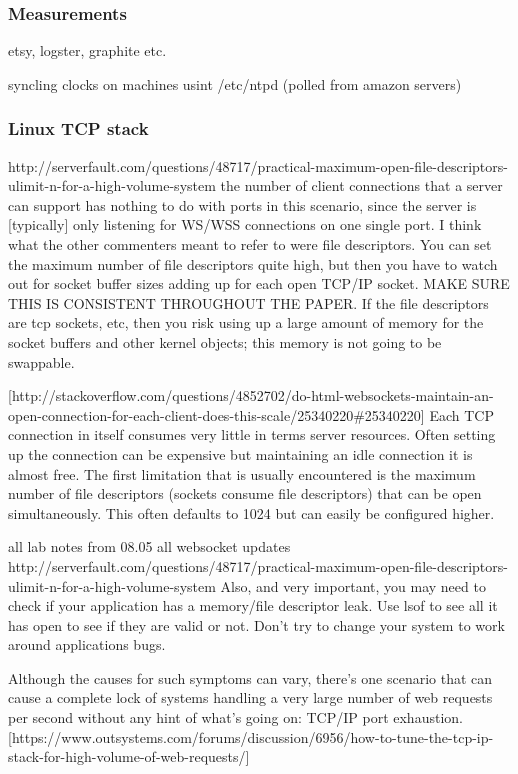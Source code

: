 \documentclass{uvamscse}
\begin{document}
\subsubsection{Measurements}
etsy, logster, graphite etc.

syncling clocks on machines usint /etc/ntpd (polled from amazon servers)

\subsubsection{Linux TCP stack}

http://serverfault.com/questions/48717/practical-maximum-open-file-descriptors-ulimit-n-for-a-high-volume-system
the number of client connections that a server can support has nothing to do with ports in this scenario, since the server is [typically] only listening for WS/WSS connections on one single port. I think what the other commenters meant to refer to were file descriptors. You can set the maximum number of file descriptors quite high, but then you have to watch out for socket buffer sizes adding up for each open TCP/IP socket.  MAKE SURE THIS IS CONSISTENT THROUGHOUT THE PAPER.
If the file descriptors are tcp sockets, etc, then you risk using up a large amount of memory for the socket buffers and other kernel objects; this memory is not going to be swappable.

[http://stackoverflow.com/questions/4852702/do-html-websockets-maintain-an-open-connection-for-each-client-does-this-scale/25340220\#25340220]
Each TCP connection in itself consumes very little in terms server resources. Often setting up the connection can be expensive but maintaining an idle connection it is almost free. The first limitation that is usually encountered is the maximum number of file descriptors (sockets consume file descriptors) that can be open simultaneously. This often defaults to 1024 but can easily be configured higher.

all lab notes from 08.05
all websocket updates
http://serverfault.com/questions/48717/practical-maximum-open-file-descriptors-ulimit-n-for-a-high-volume-system
Also, and very important, you may need to check if your application has a memory/file descriptor leak. Use lsof to see all it has open to see if they are valid or not. Don't try to change your system to work around applications bugs.

Although the causes for such symptoms can vary, there's one scenario that can cause a complete lock of systems handling a very large number of web requests per second without any hint of what's going on: TCP/IP port exhaustion. [https://www.outsystems.com/forums/discussion/6956/how-to-tune-the-tcp-ip-stack-for-high-volume-of-web-requests/]
\end{document}
